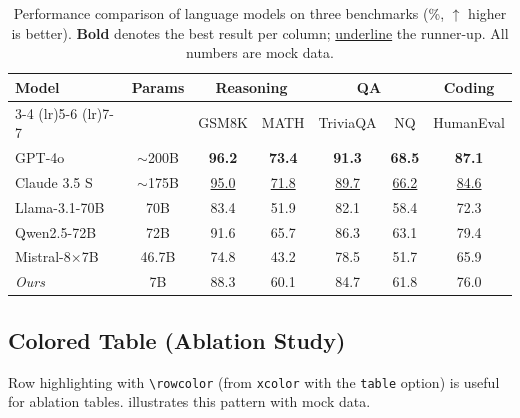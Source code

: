 \documentclass[opendfm]{xlance/xlance}
\begin{document}
\begin{table}[H]
    \centering
    \begin{tabular}{lcccccc}
        \toprule
        \multirow{2.5}{*}{\textbf{Model}} & %
        \multirow{2.5}{*}{\textbf{Params}} &
        \multicolumn{2}{c}{\textbf{Reasoning}} &
        \multicolumn{2}{c}{\textbf{QA}} &
        \textbf{Coding} \\
        \cmidrule(lr){3-4} \cmidrule(lr){5-6} \cmidrule(lr){7-7}
        &            & GSM8K            & MATH             & TriviaQA         & NQ               & HumanEval        \\
        \midrule
        GPT-4o              & $\sim$200B & \textbf{96.2}    & \textbf{73.4}    & \textbf{91.3}    & \textbf{68.5}    & \textbf{87.1}    \\
        Claude 3.5 S        & $\sim$175B & \underline{95.0} & \underline{71.8} & \underline{89.7} & \underline{66.2} & \underline{84.6} \\
        Llama-3.1-70B       & 70B        & 83.4             & 51.9             & 82.1             & 58.4             & 72.3             \\
        Qwen2.5-72B         & 72B        & 91.6             & 65.7             & 86.3             & 63.1             & 79.4             \\
        Mistral-8$\times$7B & 46.7B      & 74.8             & 43.2             & 78.5             & 51.7             & 65.9             \\
        \midrule
        \textit{Ours}       & 7B         & 88.3             & 60.1             & 84.7             & 61.8             & 76.0             \\
        \bottomrule
    \end{tabular}
    \caption{Performance comparison of language models on three benchmarks (\%, $\uparrow$ higher is better).
    \textbf{Bold} denotes the best result per column; \underline{underline} the runner-up.
    All numbers are mock data.}
    \label{tab:model_perf}
\end{table}

\subsection{Colored Table (Ablation Study)}

Row highlighting with \verb|\rowcolor| (from \texttt{xcolor} with the \texttt{table} option) is useful for ablation tables.  illustrates this pattern with mock data.
\end{document}
